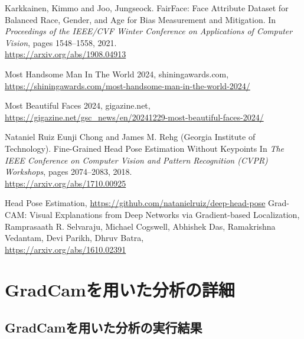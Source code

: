 \documentclass[a4paper,11pt,titlepage]{jsarticle}
\begin{document}
\begin{thebibliography}{9}
    Karkkainen, Kimmo and Joo, Jungseock.
    FairFace: Face Attribute Dataset for Balanced Race, Gender, and Age for Bias Measurement and Mitigation.
    In \textit{Proceedings of the IEEE/CVF Winter Conference on Applications of Computer Vision}, pages 1548--1558, 2021.\\
        \url{https://arxiv.org/abs/1908.04913}
    
    Most Handsome Man In The World 2024, shiningawards.com, \\
    \url{https://shiningawards.com/most-handsome-man-in-the-world-2024/}
    
    Most Beautiful Faces 2024, gigazine.net, \\ \url{https://gigazine.net/gsc_news/en/20241229-most-beautiful-faces-2024/}
    
        Nataniel Ruiz Eunji Chong and James M. Rehg (Georgia Institute of Technology).
        Fine-Grained Head Pose Estimation Without Keypoints
         In \textit{The IEEE Conference on Computer Vision and Pattern Recognition (CVPR) Workshops}, pages 2074--2083, 2018. \\
          \url{https://arxiv.org/abs/1710.00925}

    Head Pose Estimation, \url{https://github.com/natanielruiz/deep-head-pose}
    Grad-CAM: Visual Explanations from Deep Networks via Gradient-based Localization, 
    Ramprasaath R. Selvaraju, Michael Cogswell, Abhishek Das, Ramakrishna Vedantam, Devi Parikh, Dhruv Batra,\\
    \url{https://arxiv.org/abs/1610.02391}
    
\end{thebibliography}



\clearpage
\appendix %
\section{GradCamを用いた分析の詳細}

\subsection{GradCamを用いた分析の実行結果}
\end{document}
